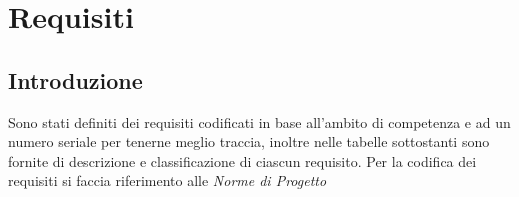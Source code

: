 


\newcommand{\RFM}{
    \stepcounter{M}
    \stepcounter{RF}
    \stepcounter{RF1}
    RF1.\arabic{RF}
}
\newcommand{\RFD}{
    \stepcounter{D}
    \stepcounter{RF}
    \stepcounter{RF2}
    RF2.\arabic{RF}
}
\newcommand{\RFO}{
    \stepcounter{O}
    \stepcounter{RF}
    \stepcounter{RF3}
    RF3.\arabic{RF}
}
\newcommand{\RVM}{
    \stepcounter{M}
    \stepcounter{RV}
    \stepcounter{RV1}
    RV1.\arabic{RV}
}
\newcommand{\RVD}{
    \stepcounter{D}
    \stepcounter{RV}
    \stepcounter{RV2}
    RV2.\arabic{RV}
}
\newcommand{\RVO}{
    \stepcounter{O}
    \stepcounter{RV}
    \stepcounter{RV3}
    RV3.\arabic{RV}
}
\newcommand{\RPM}{
    \stepcounter{M}
    \stepcounter{RP}
    \stepcounter{RP1}
    RP1.\arabic{RP}
}
\newcommand{\RPD}{
    \stepcounter{D}
    \stepcounter{RP}
    \stepcounter{RP2}
    RP2.\arabic{RP}
}
\newcommand{\RPO}{
    \stepcounter{O}
    \stepcounter{RP}
    \stepcounter{RP3}
    RP3.\arabic{RP}
}
\newcommand{\RQM}{
    \stepcounter{M}
    \stepcounter{RQ}
    \stepcounter{RQ1}
    RQ1.\arabic{RQ}
}
\newcommand{\RQD}{
    \stepcounter{D}
    \stepcounter{RQ}
    \stepcounter{RQ2}
    RQ2.\arabic{RQ}
}
\newcommand{\RQO}{
    \stepcounter{O}
    \stepcounter{RQ}
    \stepcounter{RQ3}
    RQ3.\arabic{RQ}
}



\section{Requisiti}
\subsection{Introduzione}
Sono stati definiti dei requisiti codificati in base all’ambito di competenza e ad un numero seriale per
tenerne meglio traccia, inoltre nelle tabelle sottostanti sono fornite di descrizione e classificazione di ciascun
requisito. 
Per la codifica dei requisiti si faccia riferimento alle \textit{Norme di Progetto}
